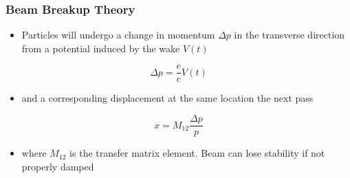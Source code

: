 \documentclass{beamer}
\begin{document}



\begin{frame}
\frametitle{Beam Breakup Theory}
\begin{itemize}
\item Particles will undergo a change in momentum $\Delta p$ in the transverse direction from a potential induced by the wake $V(t)$
\end{itemize}
\begin{equation}
\Delta p = \frac{e}{c} V(t)
\end{equation}
\begin{itemize}
\item and a corresponding displacement at the same location the next pass
\end{itemize}
\begin{equation}
x = M_{12} \frac{\Delta p}{p}
\end{equation}
\begin{itemize}
\item where $M_{12}$ is the transfer matrix element. Beam can lose stability if not properly damped
\end{itemize}
\end{frame}

\end{document}
